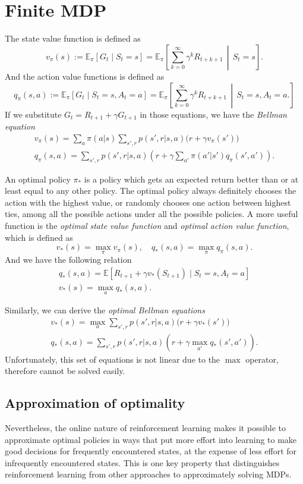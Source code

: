 \documentclass{article}
\begin{document}
\section{Finite MDP}

The state value function is defined as
\[ v_\pi(s) := \mathbb{E}_\pi[G_t\mid S_t=s] = \mathbb{E}_\pi \left[ \sum_{k=0}^{\infty} \gamma^k R_{t+k+1} \,\middle|\, S_t = s \right] . \]
And the action value functions is defined as
\[ q_\pi(s, a) := \mathbb{E}_\pi[G_t\mid S_t=s, A_t=a] = \mathbb{E}_\pi \left[ \sum_{k=0}^{\infty} \gamma^k R_{t+k+1} \,\middle|\, S_t=s, A_t=a . \right] \]
If we substitute \(G_t=R_{t+1} + \gamma G_{t+1}\) in those equations, we have the \emph{Bellman equation}
\begin{gather}
  v_\pi(s) = \sum_a \pi(a|s) \sum_{s', r} p(s', r | s, a) \big( r + \gamma v_\pi(s') \big) \\
  q_\pi(s, a) = \sum_{s', r} p(s', r | s, a) \left( r + \gamma\sum_{a'} \pi(a'|s') q_\pi(s', a') \right) .
\end{gather}

An optimal policy \(\pi_*\) is a policy which gets an expected return better than or at least equal to any other policy. The optimal policy always definitely chooses the action with the highest value, or randomly chooses one action between highest ties, among all the possible actions under all the possible policies. A more useful function is the \emph{optimal state value function} and \emph{optimal action value function}, which is defined as
\[ v_*(s) = \max_{\pi} v_\pi (s), \quad q_*(s, a) = \max_{\pi} q_\pi (s, a) . \]
And we have the following relation
\begin{gather*}
  q_*(s, a) = \mathbb{E} [ R_{t+1} + \gamma v_*(S_{t+1}) \mid S_t=s, A_t=a ] \\
  v_*(s) = \max_{a} q_*(s, a) .
\end{gather*}

Similarly, we can derive the \emph{optimal Bellman equations}
\begin{gather}
  v_*(s) = \max_a \sum_{s', r} p(s', r | s, a) \big( r + \gamma v_*(s') \big) \\
  q_*(s, a) = \sum_{s', r} p(s', r | s, a) \left( r + \gamma \max_{a'} q_*(s', a') \right) .
\end{gather}
Unfortunately, this set of equations is not linear due to the \(\max\) operator, therefore cannot be solved easily.

\subsection{Approximation of optimality}

Nevertheless, the online nature of reinforcement learning makes it possible to approximate
optimal policies in ways that put more effort into learning to make good decisions for
frequently encountered states, at the expense of less effort for infrequently encountered
states. This is one key property that distinguishes reinforcement learning from other
approaches to approximately solving MDPs.
\end{document}
